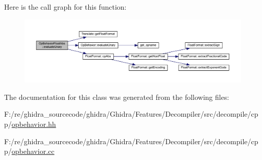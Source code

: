 Here is the call graph for this function\+:
\nopagebreak
\begin{figure}[H]
\begin{center}
\leavevmode
\includegraphics[width=350pt]{class_op_behavior_float_abs_a2471c7df22ae3b091277c8b138cdc4a1_cgraph}
\end{center}
\end{figure}


The documentation for this class was generated from the following files\+:\begin{DoxyCompactItemize}
\item 
F\+:/re/ghidra\+\_\+sourcecode/ghidra/\+Ghidra/\+Features/\+Decompiler/src/decompile/cpp/\mbox{\hyperlink{opbehavior_8hh}{opbehavior.\+hh}}\item 
F\+:/re/ghidra\+\_\+sourcecode/ghidra/\+Ghidra/\+Features/\+Decompiler/src/decompile/cpp/\mbox{\hyperlink{opbehavior_8cc}{opbehavior.\+cc}}\end{DoxyCompactItemize}
